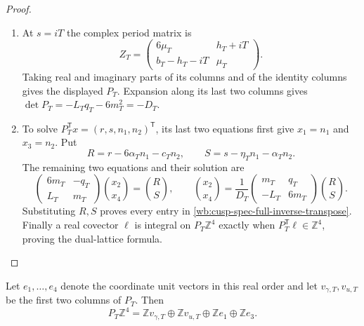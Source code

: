 \begin{proof}
\begin{enumerate}[label=\arabic*.,leftmargin=*]
\item At $s=iT$ the complex period matrix is
\[
 Z_T=\begin{pmatrix}6\mu_T&h_T+iT\\
                          b_T-h_T-iT&\mu_T\end{pmatrix}.
\]
Taking real and imaginary parts of its columns and of the identity
columns gives the displayed $P_T$.  Expansion along its last two
columns gives $\det P_T=-L_Tq_T-6m_T^2=-D_T$.

\item To solve $P_T^{\mathsf T}x=(r,s,n_1,n_2)^{\mathsf T}$, its last two
equations first give $x_1=n_1$ and $x_3=n_2$.  Put
\[
 R=r-6\alpha_Tn_1-c_Tn_2,\qquad
 S=s-\eta_Tn_1-\alpha_Tn_2.
\]
The remaining two equations and their solution are
\[
 \begin{pmatrix}6m_T&-q_T\\L_T&m_T\end{pmatrix}
 \binom{x_2}{x_4}=\binom R S,
 \qquad
 \binom{x_2}{x_4}=
 \frac1{D_T}\begin{pmatrix}m_T&q_T\\-L_T&6m_T\end{pmatrix}
 \binom R S.
\]
Substituting $R,S$ proves every entry in
\eqref{wb:cusp-spec-full-inverse-transpose}.  Finally a real covector
$\ell$ is integral on $P_T\mathbb Z^4$ exactly when
$P_T^{\mathsf T}\ell\in\mathbb Z^4$, proving the dual-lattice formula.
\end{enumerate}
\end{proof}

Let $e_1,\ldots,e_4$ denote the coordinate unit vectors in this real
order and let $v_{\gamma,T},v_{u,T}$ be the first two columns of $P_T$.
Then
\[
 P_T\mathbb Z^4=
 \mathbb Zv_{\gamma,T}\oplus\mathbb Zv_{u,T}
                 \oplus\mathbb Ze_1\oplus\mathbb Ze_3.
\]

